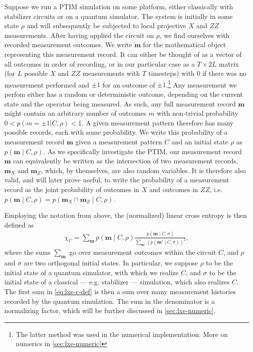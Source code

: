 Suppose we run a PTIM simulation on some platform, either classically with
stabilizer circuits or on a quantum simulator. The system is initially in some
state $\rho$ and will subsequently be subjected to local projective $X$ and
$ZZ$ measurements.  After having applied the circuit on $\rho$, we find
ourselves with recorded measurement outcomes. We write $\mathbf{m}$ for the
mathematical object representing this measurement record. It can either be
thought of as a vector of all outcomes in order of recording, or in our
particular case as a $T\times 2L$ matrix (for $L$ possible $X$ and $ZZ$
measurements with $T$ timesteps) with $0$ if there was no measurement performed
and $\pm 1$ for an outcome of $\pm 1$.\footnote{The latter method was used in
the numerical implementation.  More on numerics in \cref{sec:lxe-numeric}} Any
measurement we perfom either has a random or deterministic outcome, depending
on the current state and the operator being measured.  As such, any full
measurement record $\mathbf{m}$ might contain an arbitrary number of outcomes
$m$ with non-trivial probability $0<p(m=\pm 1 | C, \rho)<1$. A given
measurement pattern therefore has many possible records, each with some
probability.  We write this probability of a measurement record $\mathbf{m}$
given a measurement pattern $C$ and an initial state $\rho$ as $p(\mathbf{m}
\mid C, \rho)$. As we specifically investigate the PTIM, our measurement record
$\mathbf{m}$ can equivalently be written as the intersection of two measurement
records, $\mathbf{m}_X$ and $\mathbf{m}_{Z}$, which, by themselves, are also
random variables. It is therefore also valid, and will later prove useful, to
write the probability of a measurement record as the joint probability of
outcomes in $X$ and outcomes in $ZZ$, i.e.  $p\left(\mathbf{m} \mid C,
\rho\right) = p\left(\mathbf{m}_X\cap \mathbf{m}_Z\mid C,\rho\right)$.

Employing the notation from above, the (normalized) linear cross entropy is
then defined as
\begin{align}\label{eq:lxe-c-def}
  \chi_C = \sum_{\mathbf{m}} p(\mathbf{m} \mid C, \rho) \frac{p(\mathbf{m} \mid
    C, \sigma)}{\sum_{\mathbf{m}'}\left(p(\mathbf{m}' \mid
    C, \sigma)\right)^2}
,\end{align}
where the sums $\sum_\mathbf{m}$ go over measurement outcomes
within the circuit $C$, and $\rho$ and $\sigma$ are two orthogonal initial
states. In particular, we suppose $\rho$ to be the initial state of a quantum
simulator, with which we realize $C$, and $\sigma$ to be the initial state of a
classical --- e.g. stabilizer --- simulation, which also realizes $C$.
The first sum in \cref{eq:lxe-c-def} is then a sum over many measurement
histories recorded by the quantum simulation. The sum in the denominator is a
normalizing factor, which will be further discussed in \cref{sec:lxe-numeric}.


